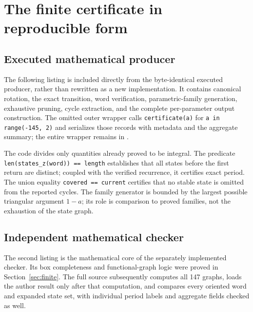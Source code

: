 \section{The finite certificate in reproducible form}
\label{app:certificate}

\subsection{Executed mathematical producer}

The following listing is included directly from the byte-identical
executed producer, rather than rewritten as a new implementation.
It contains canonical rotation, the exact transition, word
verification, parametric-family generation, exhaustive pruning,
cycle extraction, and the complete per-parameter output construction.
The omitted outer wrapper calls \texttt{certificate(a)} for
\texttt{a in range(-145, 2)} and serializes those records with
metadata and the aggregate summary; the entire wrapper remains
in .



The code divides only quantities already proved to be integral.
The predicate \texttt{len(states\_z(word)) == length} establishes
that all states before the first return are distinct; coupled
with the verified recurrence, it certifies exact period.
The union equality \texttt{covered == current} certifies that
no stable state is omitted from the reported cycles.
The family generator is bounded by the largest possible
triangular argument $1-a$; its role is comparison to proved
families, not the exhaustion of the state graph.

\subsection{Independent mathematical checker}

The second listing is the mathematical core of the separately
implemented checker. Its box completeness and functional-graph
logic were proved in Section~\ref{sec:finite}.
The full source subsequently computes all 147 graphs, loads the
author result only after that computation, and compares every
oriented word and expanded state set, with individual period
labels and aggregate fields checked as well.



